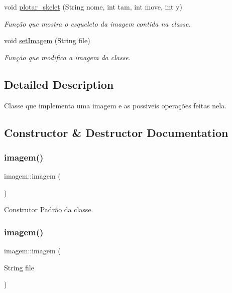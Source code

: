 \begin{DoxyCompactItemize}
void \mbox{\hyperlink{classimagem_a091cd2f5b8ef956115782b7931e69952}{plotar\+\_\+skelet}} (String nome, int tam, int move, int y)
\begin{DoxyCompactList}\small\item\em Função que mostra o esqueleto da imagem contida na classe. \end{DoxyCompactList}\item 
void \mbox{\hyperlink{classimagem_a19ce10f29593d2bb6b7206da49ffb7db}{set\+Imagem}} (String file)
\begin{DoxyCompactList}\small\item\em Função que modifica a imagem da classe. \end{DoxyCompactList}\end{DoxyCompactItemize}


\subsection{Detailed Description}
Classe que implementa uma imagem e as possiveis operações feitas nela. 



\subsection{Constructor \& Destructor Documentation}
\mbox{\label{classimagem_a8b9254383530c94a0cf7528eff9a4485}} 
\subsubsection{\texorpdfstring{imagem()}{imagem()}\hspace{0.1cm}{\footnotesize\ttfamily [1/2]}}
{\footnotesize\ttfamily imagem\+::imagem (\begin{DoxyParamCaption}{ }\end{DoxyParamCaption})\hspace{0.3cm}{\ttfamily [inline]}}



Construtor Padrão da classe. 

\mbox{\label{classimagem_a924786f40b91371f6b401e41eb98d924}} 
\subsubsection{\texorpdfstring{imagem()}{imagem()}\hspace{0.1cm}{\footnotesize\ttfamily [2/2]}}
{\footnotesize\ttfamily imagem\+::imagem (\begin{DoxyParamCaption}\item[{String}]{file }\end{DoxyParamCaption})}



